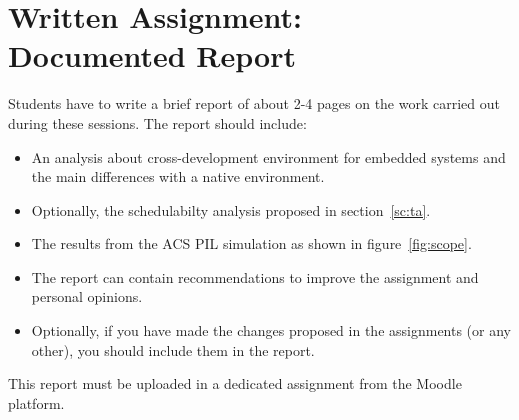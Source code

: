 \chapter*{Written Assignment: \\\vspace{7mm} Documented Report}

Students have to write a brief report of about 2-4 pages
on the work carried out during these sessions.
The report should include:

\begin{itemize}
	\item An analysis about cross-development environment for embedded systems and the main differences with a native environment.
	\item Optionally, the schedulabilty analysis proposed in section~\ref{sc:ta}.
	\item The results from the ACS PIL simulation as shown in figure~\ref{fig:scope}.
	\item The report can contain recommendations to improve the assignment and personal opinions.
	\item Optionally, if you have made the changes proposed in the assignments (or any other), you should include them in the report.
\end{itemize}

This report must be uploaded in a dedicated assignment from the Moodle platform.